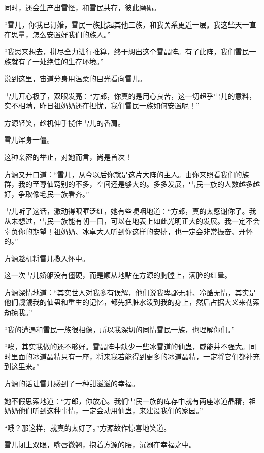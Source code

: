 \begin{this_body}
同时，还会生产出雪怪，和雪民共存，彼此磨砺。

“雪儿，你我已订婚，雪民一族比起其他三族，和我关系更近一层。我这些天一直在思量，怎么安置好我们的族人。”

“我思来想去，拼尽全力进行推算，终于想出这个雪晶阵。有了此阵，我们雪民一族就有了一处绝佳的生存环境。”

说到这里，宙道分身用温柔的目光看向雪儿。

雪儿开心极了，双眼发亮：“方郎，你真的是用心良苦，这一切超乎雪儿的意料，实不相瞒，昨日祖奶奶还在担忧，我们雪民一族如何安置呢！”

方源轻笑，趁机伸手揽住雪儿的香肩。

雪儿浑身一僵。

这种亲密的举止，对她而言，尚是首次！

方源又开口道：“雪儿，从今以后你就是这片大阵的主人。由你来照看我们的族群，我的至尊仙窍别的不多，空间还是够大的。多多发展，雪民一族的人数越多越好，争取像毛民一族看齐。”

雪儿听了这话，激动得眼眶泛红，她有些哽咽地道：“方郎，真的太感谢你了。我从未想过，雪民一族能有朝一日，可以在地表上如此光明正大的发展。我一定不会辜负你的期望！祖奶奶、冰卓大人听到你这样的安排，也一定会非常振奋、开怀的。”

方源趁机将雪儿揽入怀中。

这一次雪儿娇躯没有僵硬，而是顺从地贴在方源的胸膛上，满脸的红晕。

方源深情地道：“其实世人对我多有误解，他们说我卑鄙无耻、冷酷无情，其实是他们觊觎我的仙蛊和重生的记忆，都先把脏水泼到我的身上，然后占据大义来勒索劫掠我。”

“我的遭遇和雪民一族很相像，所以我深切的同情雪民一族，也理解你们。”

“唉，其实我做的还不够好。雪晶阵中缺少一些冰雪道的仙蛊，威能并不强大。同时里面的冰道晶精只有一座，将来我若能得到更多的冰道晶精，一定将它们都补充到这里来。”

方源的话让雪儿感到了一种甜滋滋的幸福。

她不假思索地道：“方郎，你放心。我们雪民一族的库存中就有两座冰道晶精，祖奶奶他们听到这种事情，一定会动用仙蛊，来建设我们的家园。”

“哦？那这样，就真的太好了。”方源故作惊喜地笑道。

雪儿闭上双眼，嘴唇微翘，抱着方源的腰，沉溺在幸福之中。

\end{this_body}

